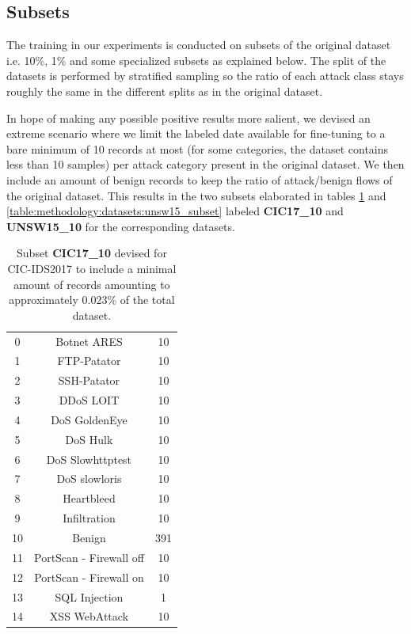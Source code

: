 \subsection{Subsets} \label{sec:methodology:subsets}

The training in our experiments is conducted on subsets of the original dataset i.e. 10\%, 1\% and some specialized subsets as explained below. The split of the datasets is performed by stratified sampling so the ratio of each attack class stays roughly the same in the different splits as in the original dataset.

In hope of making any possible positive results more salient, we devised an extreme scenario where we limit the labeled date available for fine-tuning to a bare minimum of 10 records at most (for some categories, the dataset contains less than 10 samples) per attack category present in the original dataset. We then include an amount of benign records to keep the ratio of attack/benign flows of the original dataset. This results in the two subsets elaborated in tables \ref{table:methodology:datasets:cic17_subset} and \ref{table:methodology:datasets:unsw15_subset} labeled \textbf{CIC17\_10} and \textbf{UNSW15\_10} for the corresponding datasets.

\begin{table}[H]
	\centering
	\begin{tabular}{ccc}
		\thead{\textbf{\#}} & \thead{\textbf{Class}} & \thead{\textbf{No. Records}} \\ \hline \midrule
		0  & Botnet ARES             & 10  \\
		1  & FTP-Patator             & 10  \\
		2  & SSH-Patator             & 10  \\
		3  & DDoS LOIT               & 10  \\
		4  & DoS GoldenEye           & 10  \\
		5  & DoS Hulk                & 10  \\
		6  & DoS Slowhttptest        & 10  \\
		7  & DoS slowloris           & 10  \\
		8  & Heartbleed              & 10  \\
		9  & Infiltration            & 10  \\
		10 & Benign                  & 391 \\
		11 & PortScan - Firewall off & 10  \\
		12 & PortScan - Firewall on  & 10  \\
		13 & SQL Injection           & 1   \\
		14 & XSS WebAttack           & 10                    
	\end{tabular}
	\caption{Subset \textbf{CIC17\_10} devised for CIC-IDS2017 to include a minimal amount of records amounting to approximately 0.023\% of the total dataset.}
	\label{table:methodology:datasets:cic17_subset}
\end{table}

